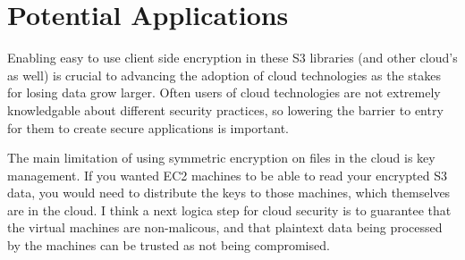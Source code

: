 \section{Potential Applications}

Enabling easy to use client side encryption in these S3 libraries (and other cloud's as well) is crucial to advancing the adoption of cloud technologies as 
the stakes for losing data grow larger. Often users of cloud technologies are not extremely knowledgable about different security practices,
so lowering the barrier to entry for them to create secure applications is important. 

The main limitation of using symmetric encryption on files in the cloud is key management. If you wanted EC2 machines to be able to read your encrypted
S3 data, you would need to distribute the keys to those machines, which themselves are in the cloud. I think a next logica step for cloud security is to
guarantee that the virtual machines are non-malicous, and that plaintext data being processed by the machines can be trusted as not being compromised.


